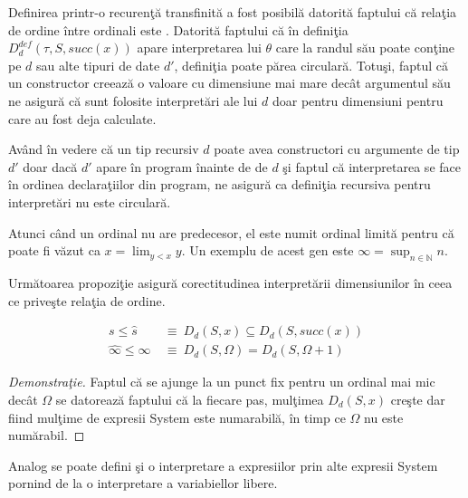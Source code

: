 \begin{remark}
Definirea printr-o recuren\c t\u a transfinit\u a a fost posibil\u a datorit\u a faptului c\u a rela\c tia de ordine \^ intre ordinali este . Datorit\u a faptului c\u a \^ in defini\c tia $D_d^{def}( \tau, S, succ(x))$ apare interpretarea lui $\theta$ care la randul s\u au poate con\c tine pe $d$ sau alte tipuri de date $d'$, defini\c tia poate p\u area circular\u a. Totu\c si, faptul c\u a un constructor creeaz\u a o valoare cu dimensiune mai mare dec\^ at argumentul s\u au ne asigur\u a c\u a sunt folosite interpret\u ari ale lui $d$ doar pentru dimensiuni pentru care au fost deja calculate.
\end{remark}
\begin{remark}
Av\^ and \^ in vedere c\u a un tip recursiv $d$ poate avea constructori cu argumente de tip $d'$ doar dac\u a $d'$ apare \^ in program \^ inainte de de $d$ \c si faptul c\u a interpretarea se face \^ in ordinea declara\c tiilor din program, ne asigur\u a ca defini\c tia recursiva pentru interpret\u ari nu este circular\u a.
\end{remark}
\begin{remark}
Atunci c\^ and un ordinal nu are predecesor, el este numit ordinal limit\u a pentru c\u a poate fi v\u azut ca $x = \lim_{y < x} y $. Un exemplu de acest gen este $\infty = \sup_{n \in \mathbb{N}}n$.
\end{remark}
\done{}

Urm\u atoarea propozi\c tie asigur\u a corectitudinea interpret\u arii dimensiunilor \^ in ceea ce prive\c ste rela\c tia de ordine.
\begin{proposition}
\begin{align*}
s \le \widehat{s}           \: &\equiv \: D_d(S,x) \subseteq D_d(S,succ(x))\\
\widehat{\infty} \le \infty \: &\equiv \: D_d(S,\Omega) = D_d(S, \Omega+1)
\end{align*}
\end{proposition}
\begin{proof}[Demonstra\c tie]
Faptul c\u a se ajunge la un punct fix pentru un ordinal mai mic dec\^ at $\Omega$ se da\-to\-re\-a\-z\u a faptului c\u a la fiecare pas, mu\-l\c ti\-me\-a $D_d(S,x)$ cre\c ste dar fiind mul\c time de expresii System \fhat este numarabil\u a, \^ in timp ce $\Omega$ nu este num\u arabil.
\end{proof}
Analog se poate defini \c si o interpretare a expresiilor prin alte expresii System \fhat pornind de la o interpretare a variabiellor libere.

